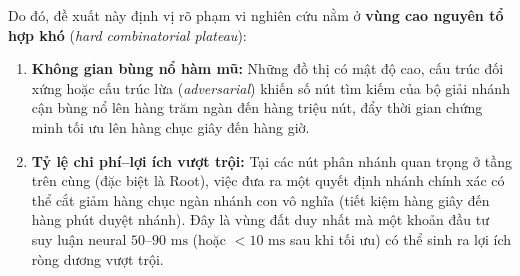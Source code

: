 \documentclass[11pt,a4paper]{article}
\begin{document}
Do đó, đề xuất này định vị rõ phạm vi nghiên cứu nằm ở \textbf{vùng cao nguyên tổ hợp khó} (\textit{hard combinatorial plateau}):
\begin{enumerate}[leftmargin=*]
    \item \textbf{Không gian bùng nổ hàm mũ:} Những đồ thị có mật độ cao, cấu trúc đối xứng hoặc cấu trúc lừa (\textit{adversarial}) khiến số nút tìm kiếm của bộ giải nhánh cận bùng nổ lên hàng trăm ngàn đến hàng triệu nút, đẩy thời gian chứng minh tối ưu lên hàng chục giây đến hàng giờ.
    \item \textbf{Tỷ lệ chi phí--lợi ích vượt trội:} Tại các nút phân nhánh quan trọng ở tầng trên cùng (đặc biệt là Root), việc đưa ra một quyết định nhánh chính xác có thể cắt giảm hàng chục ngàn nhánh con vô nghĩa (tiết kiệm hàng giây đến hàng phút duyệt nhánh). Đây là vùng đất duy nhất mà một khoản đầu tư suy luận neural $50\text{--}90\text{ ms}$ (hoặc $<10\text{ ms}$ sau khi tối ưu) có thể sinh ra lợi ích ròng dương vượt trội.
\end{enumerate}
\end{document}
